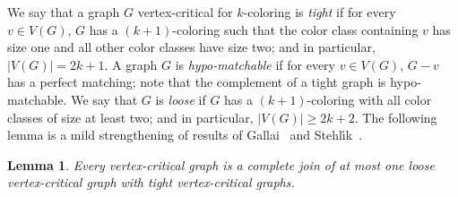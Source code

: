 \documentclass[12pt,twoside,openright,a4paper]{book}
\newtheorem{lemma}[theorem]{Lemma}
\begin{document}
We say that a graph $G$ vertex-critical for $k$-coloring is \emph{tight} if for every $v\in V(G)$, $G$ has a $(k+1)$-coloring
such that the color class containing $v$ has size one and all other color classes have size two; and in particular, $|V(G)|=2k+1$.
A graph $G$ is \emph{hypo-matchable} if for every $v\in V(G)$, $G-v$ has a perfect matching; note that the complement of a tight graph is hypo-matchable.
We say that $G$ is \emph{loose} if $G$ has a $(k+1)$-coloring with all color classes of size at least two; and in particular, $|V(G)|\ge 2k+2$.
The following lemma is a mild strengthening of results of Gallai~\cite{gallai2} and Stehl{\'\i}k~\cite{stehlik}.

\begin{lemma}\label{lemma:gallaidecomp}
Every vertex-critical graph is a complete join of at most one loose vertex-critical graph with tight vertex-critical graphs.
\end{lemma}
\end{document}
